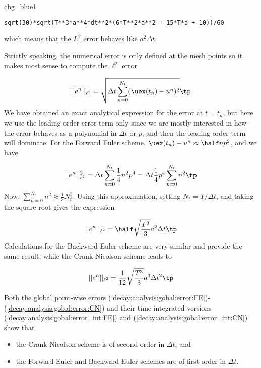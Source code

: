 \documentclass[graybox,sectrefs,envcountresetchap,open=right,final]{svmonodo}
\newenvironment{_cod_tight}[1]{
   \def\FrameCommand{\colorbox{#1}}
   \FrameRule0.6pt\MakeFramed {\FrameRestore}\vskip3mm}
   {\vskip0mm\endMakeFramed}
\newenvironment{cod}[1]{
\bgroup\rmfamily
\fboxsep=0mm\relax
\begin{_cod_tight}{#1}
\list{}{\parsep=-2mm\parskip=0mm\topsep=0pt\leftmargin=2mm
\rightmargin=2\leftmargin\leftmargin=4pt\relax}
\item\relax}
{\endlist\end{_cod_tight}\egroup}
\newenvironment{summary_mdfboxadmon}[1][]{
\begin{summary_mdfboxmdframed}[frametitle=#1]
}
{
\end{summary_mdfboxmdframed}
}
\begin{document}
\begin{cod}{cbg_blue1}\begin{Verbatim}[numbers=none,fontsize=\fontsize{9pt}{9pt},baselinestretch=0.95,xleftmargin=2mm]
sqrt(30)*sqrt(T**3*a**4*dt**2*(6*T**2*a**2 - 15*T*a + 10))/60
\end{Verbatim}
\end{cod}
\noindent
which means that the $L^2$ error behaves like $a^2\Delta t$.

Strictly speaking, the numerical error is only defined at the
mesh points so it makes most sense to compute the
$\ell^2$ error

\[ ||e^n||_{\ell^2} = \sqrt{\Delta t\sum_{n=0}^{N_t} ({\uex}(t_n) - u^n)^2}
\tp \]
We have obtained an exact analytical expression for the error at
$t=t_n$, but here we use the leading-order error term only since we
are mostly interested in how the error behaves as a polynomial in
$\Delta t$ or $p$, and then the leading order term will dominate.  For
the Forward Euler scheme, $\uex(t_n) - u^n \approx {\half}np^2$, and
we have

\[
||e^n||_{\ell^2}^2 = \Delta t\sum_{n=0}^{N_t} \frac{1}{4}n^2p^4
=\Delta t\frac{1}{4}p^4 \sum_{n=0}^{N_t} n^2\tp
\]
Now, $\sum_{n=0}^{N_t} n^2\approx \frac{1}{3}N_t^3$. Using this approximation,
setting $N_t =T/\Delta t$, and taking the square root gives the expression

\begin{equation}
||e^n||_{\ell^2} = \half\sqrt{\frac{T^3}{3}} a^2\Delta t\tp
\label{decay:analysis:gobal:error_int:FE}
\end{equation}
Calculations for the Backward Euler scheme are very similar and provide
the same result, while the Crank-Nicolson scheme leads to

\begin{equation}
||e^n||_{\ell^2} = \frac{1}{12}\sqrt{\frac{T^3}{3}}a^3\Delta t^2\tp
\label{decay:analysis:gobal:error_int:CN}
\end{equation}


\begin{summary_mdfboxadmon}
Both the global point-wise errors (\ref{decay:analysis:gobal:error:FE})-(\ref{decay:analysis:gobal:error:CN})
and their time-integrated versions (\ref{decay:analysis:gobal:error_int:FE}) and (\ref{decay:analysis:gobal:error_int:CN}) show that

\begin{itemize}
 \item the Crank-Nicolson scheme is of second order in $\Delta t$, and

 \item the Forward Euler and Backward Euler schemes are of first order in $\Delta t$.
\end{itemize}

\noindent
\end{summary_mdfboxadmon}
\end{document}
